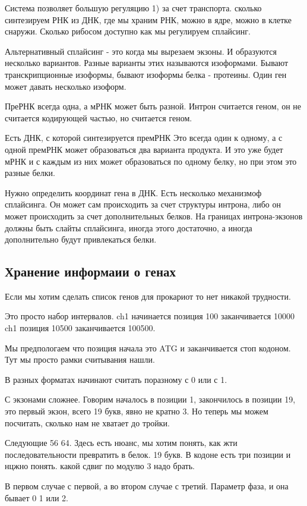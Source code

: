 Система позволяет большую регуляцию 1) за счет транспорта. 
сколько синтезируем РНК из ДНК, где мы храним РНК, можно в ядре, можно 
в клетке снаружи. Сколько рибосом доступно как мы регулируем сплайсинг. 

Альтернативный сплайсинг - это когда мы вырезаем экзоны. И образуются несколько 
вариантов. Разные варианты этих 
называются изоформами. Бывают транскрипционные изоформы, бывают 
изоформы белка - протеины. Один ген может давать несколько изоформ. 

ПреРНК всегда одна, а мРНК может быть разной. Интрон считается геном, 
он не считается кодирующей частью, но считается геном. 

Есть ДНК, с которой синтезируется премРНК Это всегда один к одному, 
а с одной премРНК может образоваться 
два варианта продукта. И это уже будет мРНК и с каждым из них 
может образоваться по одному белку, но при этом это разные белки. 

Нужно определить координат гена в ДНК. Есть несколько механизмоф сплайсинга. 
Он может сам происходить за счет структуры интрона, либо он может происходить за счет дополнительных 
белков. На границах интрона-экзонов должны быть слайты сплайсинга, иногда
этого достаточно, а иногда дополнительно будут привлекаться белки. 


\subsection{Хранение информаии о генах}
Если мы хотим сделать список генов для прокариот то нет 
никакой трудности. 

Это просто набор интервалов. 
ch1 начинается позиция 100 заканчивается 10000
ch1 позиция 10500 заканчивается 100500. 

Мы предпологаем что позиция начала это ATG и заканчивается стоп кодоном. 
Тут мы просто рамки считывания нашли. 

В разных форматах начинают считать поразному с 0 или с 1. 

С экзонами сложнее. 
Говорим началось в позиции 1, закончилось в позиции 19,
это первый экзон, всего
19 букв, явно не кратно 3. Но теперь мы можем
посчитать, сколько нам не хватает до тройки.

Следующие 56 64. Здесь есть нюанс,
мы хотим понять, как жти последовательности превратить в белок.
19 букв. В кодоне есть три позиции и нцжно понять. какой сдвиг
по модулю 3 надо брать.

В первом случае с первой, а во втором случае с третий.
Параметр фаза, и она бывает 0 1 или 2.

